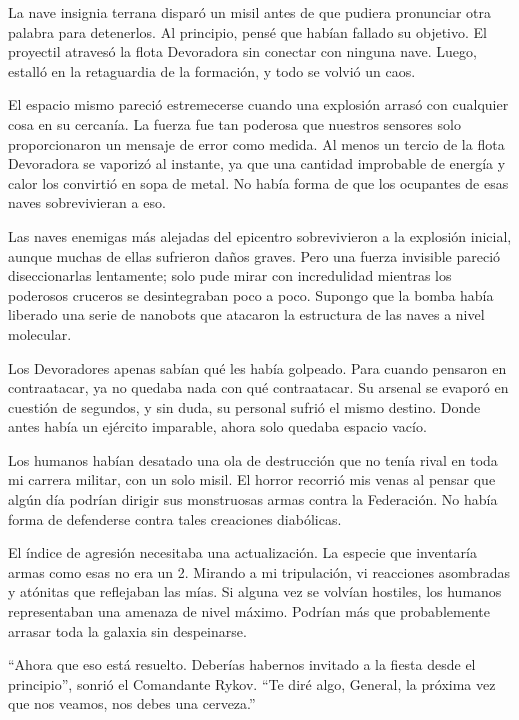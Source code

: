 \documentclass[spanish,12pt,a4paper,oneside,titlepage]{book}
\begin{document}
    La nave insignia terrana disparó un misil antes de que pudiera pronunciar otra palabra para detenerlos. Al principio, pensé que habían fallado su objetivo. El proyectil atravesó la flota Devoradora sin conectar con ninguna nave. Luego, estalló en la retaguardia de la formación, y todo se volvió un caos.

    El espacio mismo pareció estremecerse cuando una explosión arrasó con cualquier cosa en su cercanía. La fuerza fue tan poderosa que nuestros sensores solo proporcionaron un mensaje de error como medida. Al menos un tercio de la flota Devoradora se vaporizó al instante, ya que una cantidad improbable de energía y calor los convirtió en sopa de metal. No había forma de que los ocupantes de esas naves sobrevivieran a eso.

    Las naves enemigas más alejadas del epicentro sobrevivieron a la explosión inicial, aunque muchas de ellas sufrieron daños graves. Pero una fuerza invisible pareció diseccionarlas lentamente; solo pude mirar con incredulidad mientras los poderosos cruceros se desintegraban poco a poco. Supongo que la bomba había liberado una serie de nanobots que atacaron la estructura de las naves a nivel molecular.

    Los Devoradores apenas sabían qué les había golpeado. Para cuando pensaron en contraatacar, ya no quedaba nada con qué contraatacar. Su arsenal se evaporó en cuestión de segundos, y sin duda, su personal sufrió el mismo destino. Donde antes había un ejército imparable, ahora solo quedaba espacio vacío.

    Los humanos habían desatado una ola de destrucción que no tenía rival en toda mi carrera militar, con un solo misil. El horror recorrió mis venas al pensar que algún día podrían dirigir sus monstruosas armas contra la Federación. No había forma de defenderse contra tales creaciones diabólicas.

    El índice de agresión necesitaba una actualización. La especie que inventaría armas como esas no era un 2. Mirando a mi tripulación, vi reacciones asombradas y atónitas que reflejaban las mías. Si alguna vez se volvían hostiles, los humanos representaban una amenaza de nivel máximo. Podrían más que probablemente arrasar toda la galaxia sin despeinarse.

    ``Ahora que eso está resuelto. Deberías habernos invitado a la fiesta desde el principio'', sonrió el Comandante Rykov. ``Te diré algo, General, la próxima vez que nos veamos, nos debes una cerveza.''
\end{document}
